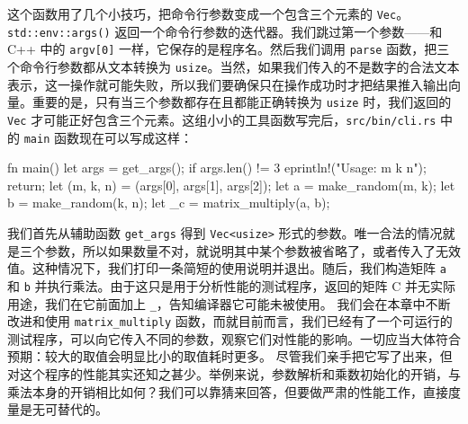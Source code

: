 这个函数用了几个小技巧，把命令行参数变成一个包含三个元素的 \texttt{Vec}。\texttt{std::\allowbreak{}env::\allowbreak{}args(\allowbreak{})\allowbreak{}} 返回一个命令行参数的迭代器。我们跳过第一个参数——和 C++ 中的 \texttt{argv[0]} 一样，它保存的是程序名。然后我们调用 \texttt{parse} 函数，把三个命令行参数都从文本转换为 \texttt{usize}。当然，如果我们传入的不是数字的合法文本表示，这一操作就可能失败，所以我们要确保只在操作成功时才把结果推入输出向量。重要的是，只有当三个参数都存在且都能正确转换为 \texttt{usize} 时，我们返回的 \texttt{Vec} 才可能正好包含三个元素。这组小小的工具函数写完后，\texttt{src/\allowbreak{}bin/\allowbreak{}cli.\allowbreak{}rs} 中的 \texttt{main} 函数现在可以写成这样：
\begin{codebox}[rust]
fn main() {
     let args = get_args();
     if args.len() != 3 {
         eprintln!("Usage: m k n");
         return;
     }
     let (m, k, n) = (args[0], args[1], args[2]);
     let a = make_random(m, k);
     let b = make_random(k, n);
     let _c = matrix_multiply(a, b);
 }
\end{codebox}
我们首先从辅助函数 \texttt{get\_args} 得到 \texttt{Vec<usize>} 形式的参数。唯一合法的情况就是三个参数，所以如果数量不对，就说明其中某个参数被省略了，或者传入了无效值。这种情况下，我们打印一条简短的使用说明并退出。随后，我们构造矩阵 \texttt{a} 和 \texttt{b} 并执行乘法。由于这只是用于分析性能的测试程序，返回的矩阵 C 并无实际用途，我们在它前面加上 \texttt{\_}，告知编译器它可能未被使用。
我们会在本章中不断改进和使用 \texttt{matrix\_\allowbreak{}multiply} 函数，而就目前而言，我们已经有了一个可运行的测试程序，可以向它传入不同的参数，观察它们对性能的影响。一切应当大体符合预期：较大的取值会明显比小的取值耗时更多。
\label{idx:idx_7c3dedf7}
尽管我们亲手把它写了出来，但对这个程序的性能其实还知之甚少。举例来说，参数解析和乘数初始化的开销，与乘法本身的开销相比如何？我们可以靠猜来回答，但要做严肃的性能工作，直接度量是无可替代的。
